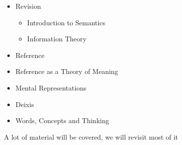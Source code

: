 \documentclass[headrule,footrule]{foils}
\begin{document}
\maketitle

%


\begin{itemize}
\item Revision
  \begin{itemize}
  \item Introduction to Semantics
  \item Information Theory
  \end{itemize}
\item Reference
\item Reference as a Theory of Meaning
\item Mental Representations
\item Deixis
\item Words, Concepts and Thinking
\end{itemize}
\begin{center}
  A lot of material will be covered, we will revisit most of it
\end{center}



\end{document}
